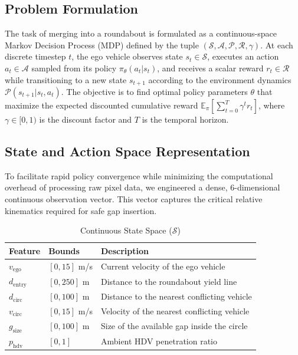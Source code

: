 \documentclass[conference]{IEEEtran}
\begin{document}
\subsection{Problem Formulation}
The task of merging into a roundabout is formulated as a continuous-space Markov Decision Process (MDP) defined by the tuple $(\mathcal{S}, \mathcal{A}, \mathcal{P}, \mathcal{R}, \gamma)$. At each discrete timestep $t$, the ego vehicle observes state $s_t \in \mathcal{S}$, executes an action $a_t \in \mathcal{A}$ sampled from its policy $\pi_\theta(a_t|s_t)$, and receives a scalar reward $r_t \in \mathcal{R}$ while transitioning to a new state $s_{t+1}$ according to the environment dynamics $\mathcal{P}(s_{t+1}|s_t, a_t)$. The objective is to find optimal policy parameters $\theta$ that maximize the expected discounted cumulative reward $\mathbb{E}_\pi[\sum_{t=0}^{T} \gamma^t r_t]$, where $\gamma \in [0, 1)$ is the discount factor and $T$ is the temporal horizon.

\subsection{State and Action Space Representation}
To facilitate rapid policy convergence while minimizing the computational overhead of processing raw pixel data, we engineered a dense, 6-dimensional continuous observation vector. This vector captures the critical relative kinematics required for safe gap insertion.

\begin{table}[htbp]
\centering
\caption{Continuous State Space ($\mathcal{S}$)}
\label{tab:state_space}
\begin{tabular}{@{}lll@{}}
\toprule
\textbf{Feature} & \textbf{Bounds} & \textbf{Description} \\ \midrule
$v_{\text{ego}}$ & $[0, 15]$ m/s & Current velocity of the ego vehicle \\
$d_{\text{entry}}$ & $[0, 250]$ m & Distance to the roundabout yield line \\
$d_{\text{circ}}$ & $[0, 100]$ m & Distance to the nearest conflicting vehicle \\
$v_{\text{circ}}$ & $[0, 15]$ m/s & Velocity of the nearest conflicting vehicle \\
$g_{\text{size}}$ & $[0, 100]$ m & Size of the available gap inside the circle \\
$p_{\text{hdv}}$ & $[0, 1]$ & Ambient HDV penetration ratio \\ \bottomrule
\end{tabular}
\end{table}
\end{document}
